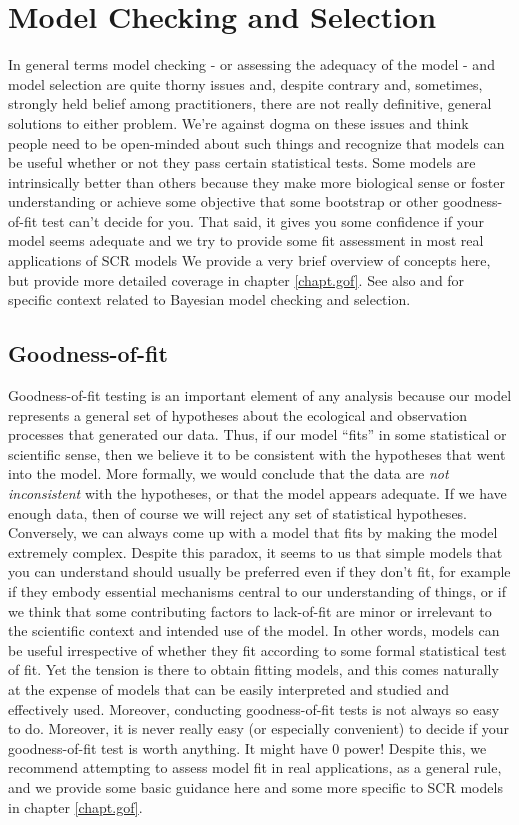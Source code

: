 \section{Model Checking and Selection}
\label{glms.sec.modsel}

In general terms model checking - or assessing the adequacy of the
model - and model selection are quite thorny issues and, despite
contrary and, sometimes, strongly held belief among practitioners, there are not
really definitive, general solutions to either problem. We're against
dogma on these issues and think people need to be open-minded about
such things and recognize that models can be useful whether or not
they pass certain statistical tests. Some models are intrinsically
better than others because they make more biological sense or foster
understanding or achieve some objective that some  bootstrap
or other goodness-of-fit test can't decide for you. That said, it
gives you some confidence if your model seems adequate and we try to
provide some fit assessment in most real applications of SCR models
We provide a very brief overview of concepts here, but provide more
detailed coverage in chapter \ref{chapt.gof}.
See also
\citet[][ch. xyz]{kery:2010} and
\citet[][ch. xyz]{link_barker:2009}
for specific context related to Bayesian
model checking and selection.

\subsection{Goodness-of-fit}

Goodness-of-fit testing is an important element of any analysis
because  our model represents a general set of hypotheses
about the ecological and observation processes that generated our
data. Thus, if our model ``fits'' in some statistical or scientific
sense, then we believe it to be consistent with the hypotheses that
went into the model. More formally, we would conclude that the data
are {\it not inconsistent} with the hypotheses, or that the model
appears adequate. If we have enough
data, then of course we will reject any set of statistical hypotheses.
Conversely, we can always come up with a model that fits by making the
model extremely complex. Despite this paradox, it seems to us that
simple models that you can understand should usually be preferred even
if they don't fit, for example if they embody essential mechanisms
central to our understanding of things, or
if we think that some contributing factors to lack-of-fit are minor or
irrelevant to the scientific context and intended use of the model.
In other words, models can be useful irrespective of whether they fit
according to some formal statistical test of fit.  Yet
the tension is there to obtain fitting models, and this comes naturally at
the expense of models that can be easily interpreted and studied and
effectively used.
Moreover, conducting goodness-of-fit tests is
not always so easy to do. Moreover, it is never really easy (or
especially convenient) to decide if your goodness-of-fit test is worth
anything. It might have 0 power!
Despite this,
we recommend attempting to assess model fit in real applications,
as a general rule, and we provide some basic guidance here and some more
specific to SCR models in
chapter \ref{chapt.gof}.

